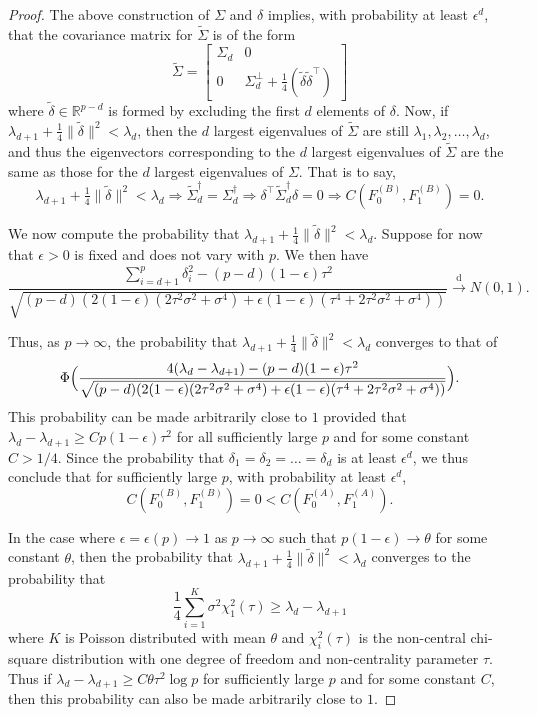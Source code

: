 \documentclass[11pt]{extarticle}
\begin{document}
\begin{proof}
The above construction of $\Sigma$ and $\delta$ implies, with probability at least $\epsilon^{d}$, that  the covariance matrix for $\tilde{\Sigma}$ is of the form
$$ \tilde{\Sigma} = \begin{bmatrix} \Sigma_{d} & 0 \\ 0 & \Sigma_{d}^{\perp} + \tfrac{1}{4} (\tilde{\delta} \tilde{\delta}^{\top}) \end{bmatrix} $$
where $\tilde{\delta} \in \mathbb{R}^{p - d}$ is formed by excluding the first $d$ elements of $\delta$.
Now, if $\lambda_{d+1} + \tfrac{1}{4} \|\tilde{\delta}\|^{2} < \lambda_d$, then
the $d$ largest eigenvalues of $\tilde{\Sigma}$ are still $\lambda_1, \lambda_2, \dots, \lambda_d$, and thus the eigenvectors corresponding to the $d$ largest eigenvalues of $\tilde{\Sigma}$ are the same as those for the $d$ largest eigenvalues of $\Sigma$. That is to say, $$ \lambda_{d+1} + \tfrac{1}{4} \|\tilde{\delta}\|^{2} < \lambda_d \Longrightarrow \tilde{\Sigma}_{d}^{\dagger} = \Sigma_{d}^{\dagger} \Longrightarrow \delta^{\top} \tilde{\Sigma}_{d}^{\dagger} \delta = 0 \Longrightarrow C(F_0^{(B)}, F_1^{(B)}) = 0.$$

We now compute the probability that $\lambda_{d+1} + \tfrac{1}{4} \|\tilde{\delta}\|^{2} < \lambda_d$. Suppose for now that $\epsilon > 0$ is fixed and does not vary with $p$. We then have
$$ \frac{\sum_{i=d+1}^{p} \delta_i^{2} - (p - d) (1 - \epsilon) \tau^2}{\sqrt{(p - d)(2 (1 - \epsilon) (2 \tau^2 \sigma^2 + \sigma^4) + \epsilon (1 - \epsilon) (\tau^4 + 2 \tau^2 \sigma^2 + \sigma^4))}} \overset{\mathrm{d}}{\longrightarrow} N(0,1).$$

Thus, as $p \rightarrow \infty$, the probability that $\lambda_{d+1} + \tfrac{1}{4} \|\tilde{\delta}\|^{2} < \lambda_d$ converges to that of
$$\Phi\Bigl(\frac{4(\lambda_d - \lambda_{d+1}) - (p - d) (1 - \epsilon) \tau^2}{\sqrt{(p - d)(2 (1 - \epsilon) (2 \tau^2 \sigma^2 + \sigma^4) + \epsilon (1 - \epsilon) (\tau^4 + 2 \tau^2 \sigma^2 + \sigma^4))}} \Bigr).$$ This probability can be made arbitrarily close to $1$ provided that $\lambda_{d} - \lambda_{d+1} \geq Cp(1 - \epsilon) \tau^2$ for all sufficiently large $p$ and for some constant $C > 1/4$. Since the probability that $\delta_1 = \delta_2 = \dots = \delta_d$ is at least $\epsilon^{d}$, we thus conclude that for sufficiently large $p$, with probability at least $\epsilon^{d}$,
$$C(F_0^{(B)}, F_1^{(B)}) = 0 < C(F_0^{(A)}, F_1^{(A)}).$$

In the case where $\epsilon = \epsilon(p) \rightarrow 1$ as $p \rightarrow \infty$ such that $p(1 - \epsilon) \rightarrow \theta$ for some constant $\theta$, then the probability that $\lambda_{d+1} + \tfrac{1}{4} \|\tilde{\delta}\|^{2} < \lambda_d$ converges to the probability that
$$\frac{1}{4} \sum_{i=1}^{K} \sigma^2 \chi_{1}^{2}(\tau) \geq \lambda_{d} - \lambda_{d+1} $$
where $K$ is Poisson distributed with mean $\theta$ and $\chi_{i}^{2}(\tau)$ is the non-central chi-square distribution with one degree of freedom and non-centrality parameter $\tau$. Thus if $\lambda_{d} - \lambda_{d+1} \geq C \theta \tau^2 \log{p}$ for sufficiently large $p$ and for some constant $C$, then this probability can also be made arbitrarily close to $1$.
\end{proof}
\end{document}
